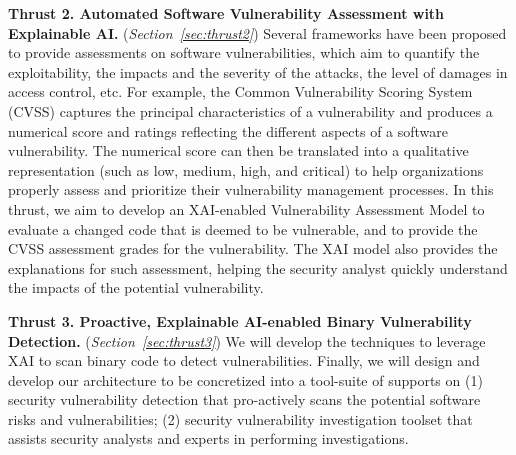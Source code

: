 \vspace{3pt}
\noindent \textbf{Thrust 2. Automated Software Vulnerability
  Assessment with Explainable AI.} ({\em Section~\ref{sec:thrust2}})
Several frameworks have been proposed to provide assessments on
software vulnerabilities, which aim to quantify the exploitability,
the impacts and the severity of the attacks, the level of damages in
access control, etc. For example, the Common Vulnerability Scoring
System (CVSS) captures the principal characteristics of a
vulnerability and produces a numerical score and ratings reflecting
the different aspects of a software vulnerability. The numerical score
can then be translated into a qualitative representation (such as low,
medium, high, and critical) to help organizations properly assess and
prioritize their vulnerability management processes. In this thrust,
we aim to develop an XAI-enabled Vulnerability Assessment Model to
evaluate a changed code that is deemed to be vulnerable, and to
provide the CVSS assessment grades for the vulnerability. The XAI
model also provides the explanations for such assessment, helping the
security analyst quickly understand the impacts of the potential
vulnerability.

\vspace{3pt}
\noindent \textbf{Thrust 3. Proactive, Explainable AI-enabled Binary
  Vulnerability Detection.} ({\em Section~\ref{sec:thrust3}}) We will
develop the techniques to leverage XAI to scan binary code to detect
vulnerabilities. Finally, we will design and develop our architecture
to be concretized into a tool-suite of supports on (1) security
vulnerability detection that pro-actively scans the potential software
risks and vulnerabilities; (2) security vulnerability investigation
toolset that assists security analysts and experts in performing
investigations.






